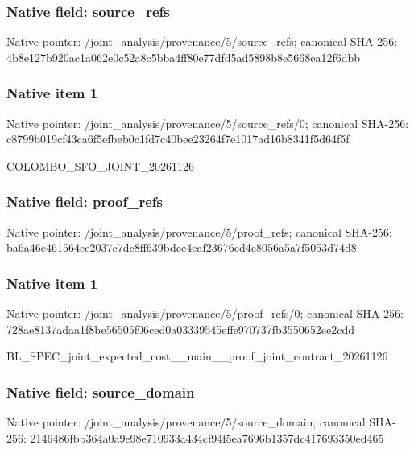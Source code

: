 \documentclass[10pt,a4paper]{article}
\begin{document}
\subsubsection{Native field: source\_refs}


Native pointer: /joint\_analysis/provenan\allowbreak{}ce/5/source\_refs; canonical SHA-256: 4b8e127b920ac1a062e0c52a\allowbreak{}8c5bba4ff80e77dfd5ad5898\allowbreak{}b8e5668ea12f6dbb



\subsubsection{Native item 1}


Native pointer: /joint\_analysis/provenan\allowbreak{}ce/5/source\_refs/0; canonical SHA-256: c8799b019cf43ca6f5efbeb0\allowbreak{}c1fd7c40bee23264f7e1017a\allowbreak{}d16b8341f5d64f5f


COLOMBO\_SFO\_JOINT\_20261126


\subsubsection{Native field: proof\_refs}


Native pointer: /joint\_analysis/provenance/5/proof\_refs; canonical SHA-256: ba6a46e461564ee2037c7dc8\allowbreak{}ff639bdce4caf23676ed4c80\allowbreak{}56a5a7f5053d74d8



\subsubsection{Native item 1}


Native pointer: /joint\_analysis/provenan\allowbreak{}ce/5/proof\_refs/0; canonical SHA-256: 728ae8137adaa1f8be56505f\allowbreak{}06ced0a03339545effe97073\allowbreak{}7fb3550652ee2cdd


BL\_SPEC\_joint\_expected\_c\allowbreak{}ost\_\_main\_\_proof\_joint\_c\allowbreak{}ontract\_20261126


\subsubsection{Native field: source\_domain}


Native pointer: /joint\_analysis/provenan\allowbreak{}ce/5/source\_domain; canonical SHA-256: 2146486fbb364a0a9e98e710\allowbreak{}933a434cf94f5ea7696b1357\allowbreak{}dc417693350ed465
\end{document}
